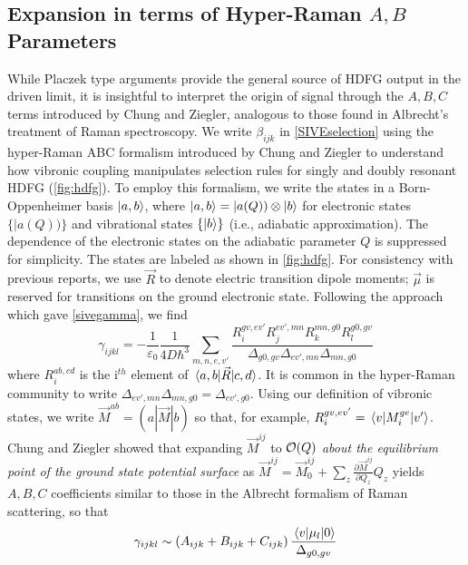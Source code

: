 \documentclass[aip, jcp, reprint, onecolumn]{revtex4-2}
\begin{document}
\subsection{Expansion in terms of Hyper-Raman $A,B$ Parameters}
While Placzek type arguments provide the general source of HDFG output in the driven limit, it is insightful to interpret the origin of signal through the $A,B,C$ terms introduced by Chung and Ziegler, analogous to those found in Albrecht's treatment of Raman spectroscopy.\cite{Albrecht1961, Ziegler1988} 
We write $\beta_{ijk}$ in \autoref{SIVEselection} using the hyper-Raman ABC formalism introduced by Chung and Ziegler to understand how vibronic coupling manipulates selection rules for singly and doubly resonant HDFG (\autoref{fig:hdfg}). \cite{Ziegler1988}
To employ this formalism, we write the states in a Born-Oppenheimer basis $\ket{a,b}$, where $\ket{a,b} = |a(Q)) \otimes \ket{b}$ for electronic states $\{|a(Q))\}$ and vibrational states $\{\ket{b}\}$ (i.e., adiabatic approximation). \cite{BornOppenheimer, Tang1970}
The dependence of the electronic states on the adiabatic parameter $Q$ is suppressed for simplicity.
The states are labeled as shown in \autoref{fig:hdfg}.
For consistency with previous reports, we use $\vec{R}$ to denote electric transition dipole moments; $\vec{\mu}$ is reserved for transitions on the ground electronic state. \cite{Tang1970}
Following the approach which gave \autoref{sivegamma}, we find
\begin{equation}\label{drgamma_notaylor}
	\gamma_{ijkl} = -\frac{1}{\varepsilon_0} \frac{1}{4D \hbar^3} \sum_{m,n,e,v'} \frac{
		R_{i}^{gv, ev'} 
		R_{j}^{ev',mn} 
		R_{k}^{mn,g0} 
		R_{l}^{g0,gv} 
	}{\Delta_{g0,gv}
		\Delta_{ev', mn}
		\Delta_{mn, g0}
	}
\end{equation}
where $R_{i}^{ab,cd}$ is the i$^{th}$ element of $\mel{a,b}{\vec{R}}{c,d}$.
It is common in the hyper-Raman community to write $\Delta_{ev', mn} \Delta_{mn, g0} = \Delta_{ev', g0}$.
Using our definition of vibronic states, we write $\vec{M}^{ab} = (a|\vec{M}|b)$ so that, for example,
$R_{i}^{gv,ev'} = \mel{v}{M_i^{ge}}{v'}$.
Chung and Ziegler showed that expanding $\vec{M}^{ij}$ to $\order{Q}$ \textit{about the equilibrium point of the ground state potential surface} as
$\vec{M}^{ij} = \vec{M}^{ij}_0 + \sum_z \frac{\partial\vec{M}^{ij}}{\partial Q_z} Q_z$
yields $A, B, C$ coefficients similar to those in the Albrecht formalism of Raman scattering, \cite{Albrecht1961, Ziegler1988} so that
\begin{equation}
		\gamma_{ijkl} \sim \left(A_{ijk} + B_{ijk} + C_{ijk}\right) \frac{\mel{v}{\mu_{l}}{0}} {\Delta_{g0,gv}}
\end{equation}
\end{document}

